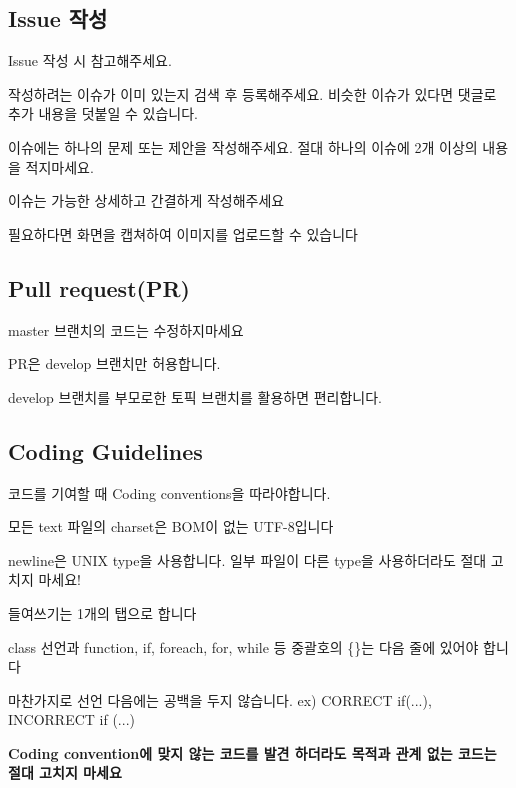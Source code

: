 \subsection*{Issue 작성}

Issue 작성 시 참고해주세요.


\begin{DoxyItemize}
\item 작성하려는 이슈가 이미 있는지 검색 후 등록해주세요. 비슷한 이슈가 있다면 댓글로 추가 내용을 덧붙일 수 있습니다.
\item 이슈에는 하나의 문제 또는 제안을 작성해주세요. 절대 하나의 이슈에 2개 이상의 내용을 적지마세요.
\item 이슈는 가능한 상세하고 간결하게 작성해주세요
\begin{DoxyItemize}
\item 필요하다면 화면을 캡쳐하여 이미지를 업로드할 수 있습니다
\end{DoxyItemize}
\end{DoxyItemize}

\subsection*{Pull request(\+P\+R)}


\begin{DoxyItemize}
\item {\ttfamily master} 브랜치의 코드는 수정하지마세요
\item P\+R은 {\ttfamily develop} 브랜치만 허용합니다.
\item {\ttfamily develop} 브랜치를 부모로한 토픽 브랜치를 활용하면 편리합니다.
\end{DoxyItemize}

\subsection*{Coding Guidelines}

코드를 기여할 때 Coding conventions을 따라야합니다.


\begin{DoxyItemize}
\item 모든 text 파일의 charset은 B\+O\+M이 없는 U\+T\+F-\/8입니다
\item newline은 U\+N\+I\+X type을 사용합니다. 일부 파일이 다른 type을 사용하더라도 절대 고치지 마세요!
\item 들여쓰기는 1개의 탭으로 합니다
\item class 선언과 function, if, foreach, for, while 등 중괄호의 {\ttfamily \{\}}는 다음 줄에 있어야 합니다
\begin{DoxyItemize}
\item 마찬가지로 선언 다음에는 공백을 두지 않습니다. ex) C\+O\+R\+R\+E\+C\+T {\ttfamily if(...)}, I\+N\+C\+O\+R\+R\+E\+C\+T {\ttfamily if (...)}
\end{DoxyItemize}
\item {\bfseries Coding convention에 맞지 않는 코드를 발견 하더라도 목적과 관계 없는 코드는 절대 고치지 마세요} 
\end{DoxyItemize}